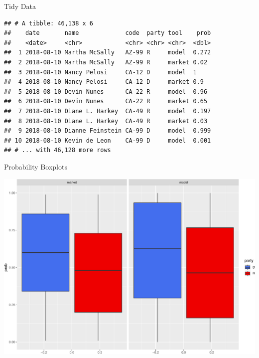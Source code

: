\documentclass[ignorenonframetext,]{beamer}
\begin{document}
\begin{frame}[fragile]{Tidy Data}

\begin{verbatim}
## # A tibble: 46,138 x 6
##    date       name             code  party tool    prob
##    <date>     <chr>            <chr> <chr> <chr>  <dbl>
##  1 2018-08-10 Martha McSally   AZ-99 R     model  0.272
##  2 2018-08-10 Martha McSally   AZ-99 R     market 0.02 
##  3 2018-08-10 Nancy Pelosi     CA-12 D     model  1    
##  4 2018-08-10 Nancy Pelosi     CA-12 D     market 0.9  
##  5 2018-08-10 Devin Nunes      CA-22 R     model  0.96 
##  6 2018-08-10 Devin Nunes      CA-22 R     market 0.65 
##  7 2018-08-10 Diane L. Harkey  CA-49 R     model  0.197
##  8 2018-08-10 Diane L. Harkey  CA-49 R     market 0.03 
##  9 2018-08-10 Dianne Feinstein CA-99 D     model  0.999
## 10 2018-08-10 Kevin de Leon    CA-99 D     model  0.001
## # ... with 46,128 more rows
\end{verbatim}

\end{frame}

\begin{frame}{Probability Boxplots}

\includegraphics{markets_models_files/figure-beamer/prob box-1.pdf}

\end{frame}
\end{document}
